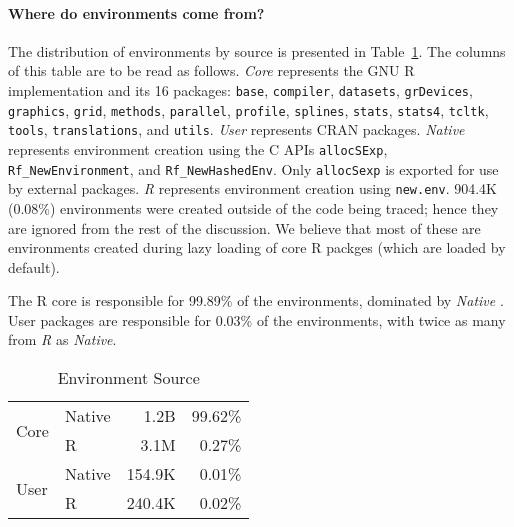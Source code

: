 \documentclass[10pt,review,sigplan,anonymous=true,authorversion=true,nonacm=true]{acmart}
\newcommand{\code}[1]{\lstinline |#1|\xspace}
\newcommand{\newEnv}{\code{new.env}}
\begin{document}
\paragraph{Where do environments come from?} The distribution of environments by
source is presented in Table~\ref{table:env_source}. The columns of this table
are to be read as follows. \emph{Core} represents the GNU R implementation and
its 16 packages: \code{base}, \code{compiler}, \code{datasets},
\code{grDevices}, \code{graphics}, \code{grid}, \code{methods}, \code{parallel},
\code{profile}, \code{splines}, \code{stats}, \code{stats4}, \code{tcltk},
\code{tools}, \code{translations}, and \code{utils}. \emph{User} represents CRAN
packages. \emph{Native} represents environment creation using the C APIs
\code{allocSExp}, \code{Rf_NewEnvironment}, and \code{Rf_NewHashedEnv}. Only
\code{allocSexp} is exported for use by external packages. \emph{R} represents
environment creation using \newEnv. 904.4K (0.08\%) environments were created
outside of the code being traced; hence they are ignored from the rest of the
discussion. We believe that most of these are environments created during lazy
loading of core R packges (which are loaded by default).

The R core is responsible for 99.89\% of the environments, dominated by
\emph{Native} . User packages are responsible for 0.03\% of the environments,
with twice as many from \emph{R} as \emph{Native}.

\begin{table}[!h]
  \vspace{-3mm}
  \small
  \centering
  \caption{Environment Source}\label{table:env_source}
  \vspace{-3mm}
  \begin{tabular}{llrr}
    \toprule
    \multirow{2}{*}{Core}  & \multicolumn{1}{l}{Native} & \multicolumn{1}{r}{1.2B} & \multicolumn{1}{r}{99.62\%}\\
                           & \multicolumn{1}{l}{R}     & \multicolumn{1}{r}{3.1M} & \multicolumn{1}{r}{0.27\%}\\
    \midrule
    \multirow{2}{*}{User}  & \multicolumn{1}{l}{Native} & \multicolumn{1}{r}{154.9K} & \multicolumn{1}{r}{0.01\%}\\
                           & \multicolumn{1}{l}{R}      & \multicolumn{1}{r}{240.4K} & \multicolumn{1}{r}{0.02\%}\\
    \bottomrule
  \end{tabular}
\end{table}
\end{document}
